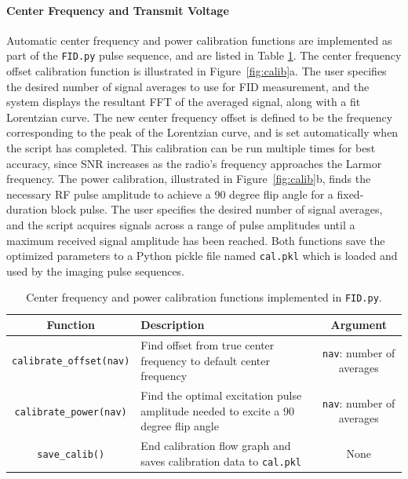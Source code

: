 \documentclass[10pt,letterpaper]{article}
\begin{document}
\paragraph{Center Frequency and Transmit Voltage} Automatic center frequency and power
calibration functions are implemented as part of the \texttt{FID.py} pulse sequence, 
and are listed in Table \ref{table:calib_functions}.
The center frequency offset calibration function is illustrated in Figure~\ref{fig:calib}a.  
The user specifies the desired number of signal averages to use for FID measurement, 
and the system displays the resultant FFT of the averaged signal, along with a fit Lorentzian curve.
The new center frequency offset is defined to be the frequency corresponding to the peak of the Lorentzian curve, 
and is set automatically when the script has completed.  
This calibration can be run multiple times for best accuracy, 
since SNR increases as the radio's frequency approaches the Larmor frequency.
The power calibration, illustrated in Figure~\ref{fig:calib}b, 
finds the necessary RF pulse amplitude to achieve a 90 degree flip angle for a fixed-duration block pulse.  
The user specifies the desired number of signal averages, 
and the script acquires signals across a range of pulse amplitudes until a maximum received signal amplitude has been reached.
Both functions save the optimized parameters to a Python pickle file named \texttt{cal.pkl} 
which is loaded and used by the imaging pulse sequences.  

\begin{table}
\begin{tabularx}{\textwidth}{| c | X | c |}
	\hline
	\textbf{Function} & \textbf{Description} & \textbf{Argument}  \\ \hline
	\texttt{calibrate\_offset(nav)} & Find offset from true center frequency to default center frequency & \texttt{nav}: number of averages\\ \hline
	\texttt{calibrate\_power(nav)} & Find the optimal excitation pulse amplitude needed to excite a 90 degree flip angle & \texttt{nav}: number of averages\\ \hline
	\texttt{save\_calib()} & End calibration flow graph and saves calibration data to \texttt{cal.pkl} & None\\ \hline	
\end{tabularx}
\caption{Center frequency and power calibration functions implemented in \texttt{FID.py}.}
\label{table:calib_functions}
\end{table}
\end{document}

